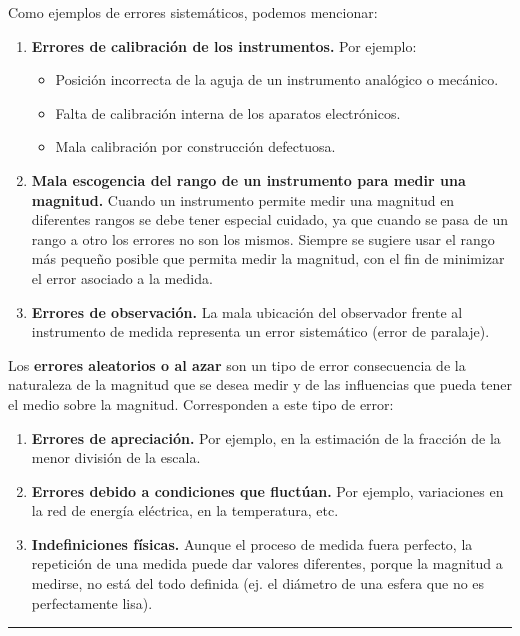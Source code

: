 \documentclass[12pt,a4paper]{article}
\begin{document}
Como ejemplos de errores sistemáticos, podemos mencionar:
\begin{enumerate}
    \item \textbf{Errores de calibración de los instrumentos.} Por ejemplo:
    \begin{itemize}
        \item[a)] Posición incorrecta de la aguja de un instrumento analógico o mecánico.
        \item[b)] Falta de calibración interna de los aparatos electrónicos.
        \item[c)] Mala calibración por construcción defectuosa.
    \end{itemize}
    \item \textbf{Mala escogencia del rango de un instrumento para medir una magnitud.} Cuando un instrumento permite medir una magnitud en diferentes rangos se debe tener especial cuidado, ya que cuando se pasa de un rango a otro los errores no son los mismos. Siempre se sugiere usar el rango más pequeño posible que permita medir la magnitud, con el fin de minimizar el error asociado a la medida.
    \item \textbf{Errores de observación.} La mala ubicación del observador frente al instrumento de medida representa un error sistemático (error de paralaje).
\end{enumerate}

Los \textbf{errores aleatorios o al azar} son un tipo de error consecuencia de la naturaleza de la magnitud que se desea medir y de las influencias que pueda tener el medio sobre la magnitud. Corresponden a este tipo de error:

\begin{enumerate}
    \item \textbf{Errores de apreciación.} Por ejemplo, en la estimación de la fracción de la menor división de la escala. 
    \item \textbf{Errores debido a condiciones que fluctúan.} Por ejemplo, variaciones en la red de energía eléctrica, en la temperatura, etc.
    \item \textbf{Indefiniciones físicas.} Aunque el proceso de medida fuera perfecto, la repetición de una medida puede dar valores diferentes, porque la magnitud a medirse, no está del todo definida (ej. el diámetro de una esfera que no es perfectamente lisa).
\end{enumerate}

\vspace{0.5cm}
\hrule
\vspace{0.5cm}
\end{document}
